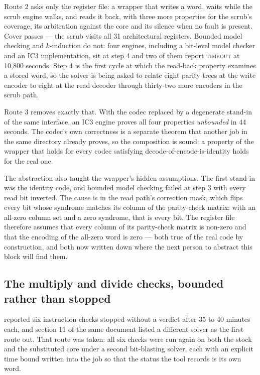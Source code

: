 Route 2 asks only the register file: a wrapper that writes a word,
waits while the scrub engine walks, and reads it back, with three more
properties for the scrub's coverage, its arbitration against the core
and its silence when no fault is present. Cover passes --- the scrub
visits all 31 architectural registers. Bounded model checking and
$k$-induction do not: four engines, including a bit-level model checker
and an IC3 implementation, sit at step 4 and two of them report
\textsc{timeout} at 10{,}800 seconds. Step 4 is the first cycle at which
the read-back property examines a stored word, so the solver is being
asked to relate eight parity trees at the write encoder to eight at the
read decoder through thirty-two more encoders in the scrub path.

Route 3 removes exactly that. With the codec replaced by a degenerate
stand-in of the same interface, an IC3 engine proves all four
properties \emph{unbounded} in 44 seconds. The codec's own correctness
is a separate theorem that another job in the same directory already
proves, so the composition is sound: a property of the wrapper that
holds for every codec satisfying decode-of-encode-is-identity holds for
the real one.

The abstraction also taught the wrapper's hidden assumptions. The first
stand-in was the identity code, and bounded model checking failed at
step 3 with every read bit inverted. The cause is in the read path's
correction mask, which flips every bit whose syndrome matches its
column of the parity-check matrix: with an all-zero column set and a
zero syndrome, that is every bit. The register file therefore assumes
that every column of its parity-check matrix is non-zero and that the
encoding of the all-zero word is zero --- both true of the real code by
construction, and both now written down where the next person to
abstract this block will find them.

\subsection{The multiply and divide checks, bounded rather than
stopped}
\label{sec:mext-result}

 reported six instruction checks stopped without
a verdict after 35 to 40 minutes each, and section 11 of the same
document listed a different solver as the first route out. That route
was taken: all six checks were run again on both the stock and the
substituted core under a second bit-blasting solver, each with an
explicit time bound written into the job so that the status the tool
records is its own word.

